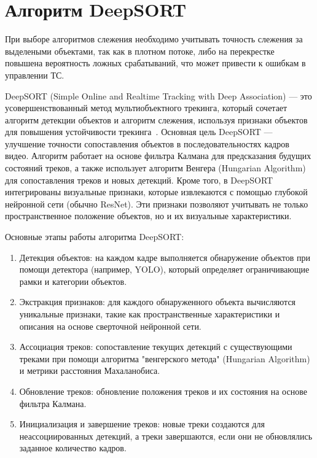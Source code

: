 \section{Алгоритм DeepSORT}

При выборе алгоритмов слежения необходимо учитывать точность слежения за выделеными объектами, так как в плотном потоке, либо на перекрестке повышена вероятность ложных срабатываний, что может привести к ошибкам в управлении ТС.

DeepSORT (Simple Online and Realtime Tracking with Deep Association) — это усовершенствованный метод мультиобъектного трекинга, который сочетает алгоритм детекции объектов и алгоритм слежения, используя признаки объектов для повышения устойчивости трекинга~\cite{url:DeepSort, article:Bewley2016}. Основная цель DeepSORT — улучшение точности сопоставления объектов в последовательностях кадров видео. Алгоритм работает на основе фильтра Калмана для предсказания будущих состояний треков, а также использует алгоритм Венгера (Hungarian Algorithm)~\cite{book:Venger} для сопоставления треков и новых детекций. Кроме того, в DeepSORT интегрированы визуальные признаки, которые извлекаются с помощью глубокой нейронной сети (обычно ResNet). Эти признаки позволяют учитывать не только пространственное положение объектов, но и их визуальные характеристики.

Основные этапы работы алгоритма DeepSORT:

\begin{enumerate}
    \item Детекция объектов: на каждом кадре выполняется обнаружение объектов при помощи детектора (например, YOLO), который определяет ограничивающие рамки и категории объектов.
    \item Экстракция признаков: для каждого обнаруженного объекта вычисляются уникальные признаки, такие как пространственные характеристики и описания на основе сверточной нейронной сети.
    \item Ассоциация треков: сопоставление текущих детекций с существующими треками при помощи алгоритма "венгерского метода" (Hungarian Algorithm) и метрики расстояния Махаланобиса.
    \item Обновление треков: обновление положения треков и их состояния на основе фильтра Калмана.
    \item Инициализация и завершение треков: новые треки создаются для неассоциированных детекций, а треки завершаются, если они не обновлялись заданное количество кадров.
\end{enumerate}

